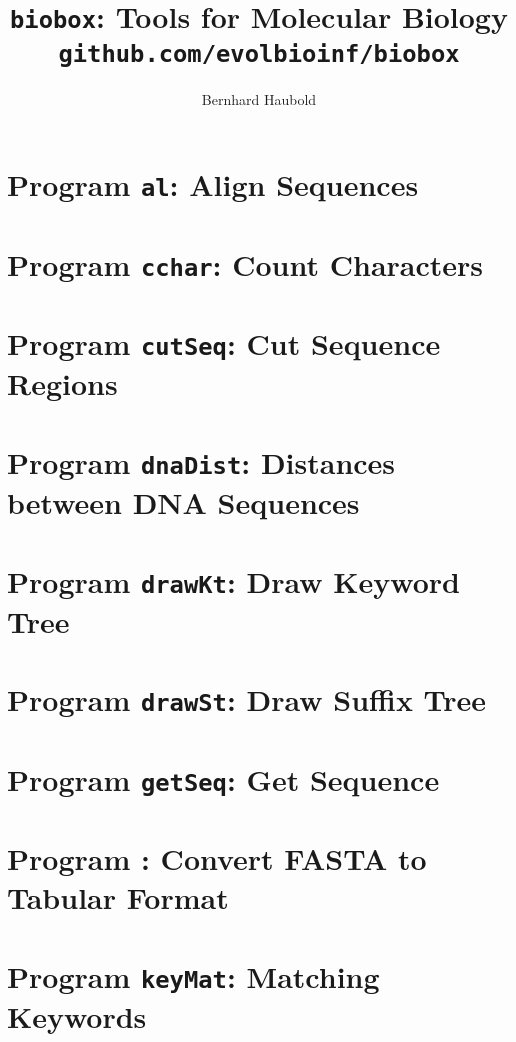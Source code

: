 \documentclass[a4paper]{report}
\begin{document}
\pagestyle{noweb}

\title{\texttt{biobox}: Tools for Molecular Biology\\
\small\texttt{github.com/evolbioinf/biobox}}
\author{Bernhard Haubold}
\maketitle
\tableofcontents

\chapter{Program \texttt{al}: Align Sequences}\label{ch:al}

\chapter{Program \texttt{cchar}: Count Characters}\label{ch:cch}

\chapter{Program \texttt{cutSeq}: Cut Sequence Regions}\label{ch:cut}

\chapter{Program \texttt{dnaDist}: Distances between DNA Sequences}\label{ch:dna}

\chapter{Program \texttt{drawKt}: Draw Keyword Tree}\label{ch:dkt}

\chapter{Program \texttt{drawSt}: Draw Suffix Tree}\label{ch:dst}

\chapter{Program \texttt{getSeq}: Get Sequence}\label{ch:get}

\chapter{Program : Convert FASTA to Tabular
  Format}\label{ch:f2t}

\chapter{Program \texttt{keyMat}: Matching Keywords}\label{ch:km}

\end{document}
